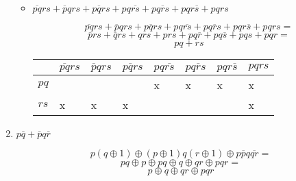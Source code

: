 \documentclass{article}
\begin{document}
\begin{enumerate}
\begin{itemize}
\begin{comment}
\end{comment}


\item $\overline{pq}rs+\overline{p}qrs+p\overline{q}rs+pq\overline{rs}+pq\overline{r}s+pqr\overline{s}+pqrs$

  $$\overline{pq}rs+\overline{p}qrs+p\overline{q}rs+pq\overline{rs}+pq\overline{r}s+pqr\overline{s}+pqrs
  =$$
$$\overline{p}rs+\overline{q}rs+qrs+prs+pq\overline{r}+pq\overline{s}+pqs+pqr
=$$ $$pq+rs$$


\begin{tabular}{|l|l|l|l|l|l|l|l|}
\hline
 & $\overline{pq}rs$ & $\overline{p}qrs$ & $p\overline{q}rs$ & $pq\overline{rs}$ & $pq\overline{r}s$ & $pqr\overline{s}$ & $pqrs$ \\
\hline
$pq$ &  &  &  & x & x & x & x \\
\hline
$rs$ & x & x & x &  &  &  & x \\
\hline
\end{tabular}

\begin{comment}
#+ORGTBL: SEND table2 orgtbl-to-latex :splice t :skip 0
|------+-------------------+-------------------+-------------------+-------------------+-------------------+-------------------+--------|
|      | $\overline{pq}rs$ | $\overline{p}qrs$ | $p\overline{q}rs$ | $pq\overline{rs}$ | $pq\overline{r}s$ | $pqr\overline{s}$ | $pqrs$ |
|------+-------------------+-------------------+-------------------+-------------------+-------------------+-------------------+--------|
| $pq$ |                   |                   |                   | x                 | x                 | x                 | x      |
|------+-------------------+-------------------+-------------------+-------------------+-------------------+-------------------+--------|
| $rs$ | x                 | x                 | x                 |                   |                   |                   | x      |
|------+-------------------+-------------------+-------------------+-------------------+-------------------+-------------------+--------|
\end{comment}

\end{itemize}

\item $p\overline{q}+\overline{p}q\overline{r}$

$$p(q \oplus 1) \oplus (p \oplus 1)q(r \oplus 1) \oplus
p\overline{p}q\overline{qr} = $$
$$pq \oplus p \oplus pq \oplus q \oplus qr \oplus pqr = $$
$$p \oplus q \oplus qr \oplus pqr $$



\end{enumerate}
\end{document}
